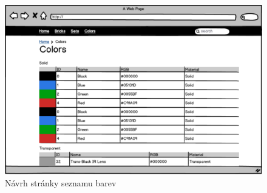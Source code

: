 \begin{figure}[htbp]
    \centering
    \includegraphics[width=\textwidth,height=\textheight,keepaspectratio]{pdfs/wireframe_colors.pdf}
    \caption{Návrh stránky seznamu barev}\label{wireframe-barvy}
\end{figure}